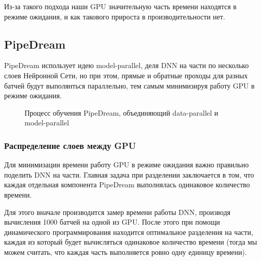 \indent\setlength{\parindent}{1em} 
Из-за такого подхода наши GPU значительную часть времени находятся в режиме ожидания, и как такового прироста в производительности нет.

\subsection{PipeDream}
\indent\setlength{\parindent}{1em}  
PipeDream использует идею model-parallel, деля DNN на части по несколько слоев Нейронной Сети, но при этом, прямые и обратные проходы для разных батчей будут выполянться параллельно, тем самым минимизируя работу GPU в режиме ожидания.

\begin{figure}[h]%
	\centering
	\caption{Процесс обучения PipeDream, объединяющий data-parallel и model-parallel}
	\label{framework} %
\end{figure}

\newpage
\subsubsection{Распределение слоев между GPU}
\indent\setlength{\parindent}{1em}  
Для минимизации времени работу GPU в режиме ожидания важно правильно поделить DNN на части. Главная задача при разделении заключается в том, что каждая отдельная компонента PipeDream выполнялась одинаковое количество времени.

Для этого вначале производится замер времени работы DNN, производя вычисления 1000 батчей на одной из GPU. После этого при помощи динамического программирования находится оптимальное разделения на части, каждая из который будет вычисляться одинаковое количество времени (тогда мы можем считать, что каждая часть выполняется ровно одну единицу времени).

